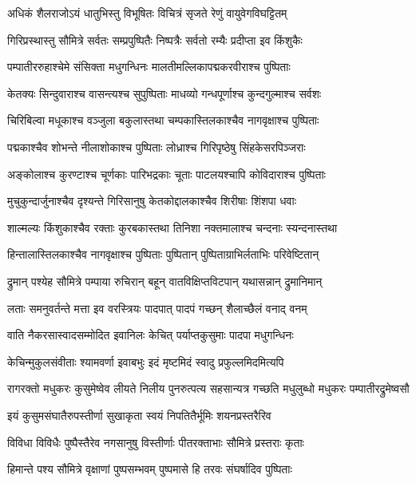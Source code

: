 \twolineshloka
{अधिकं शैलराजोऽयं धातुभिस्तु विभूषितः}
{विचित्रं सृजते रेणुं वायुवेगविघट्टितम्} %

\twolineshloka
{गिरिप्रस्थास्तु सौमित्रे सर्वतः सम्प्रपुष्पितैः}
{निष्पत्रैः सर्वतो रम्यैः प्रदीप्ता इव किंशुकैः} %

\twolineshloka
{पम्पातीररुहाश्चेमे संसिक्ता मधुगन्धिनः}
{मालतीमल्लिकापद्मकरवीराश्च पुष्पिताः} %

\twolineshloka
{केतक्यः सिन्दुवाराश्च वासन्त्यश्च सुपुष्पिताः}
{माधव्यो गन्धपूर्णाश्च कुन्दगुल्माश्च सर्वशः} %

\twolineshloka
{चिरिबिल्वा मधूकाश्च वञ्जुला बकुलास्तथा}
{चम्पकास्तिलकाश्चैव नागवृक्षाश्च पुष्पिताः} %

\twolineshloka
{पद्मकाश्चैव शोभन्ते नीलाशोकाश्च पुष्पिताः}
{लोध्राश्च गिरिपृष्ठेषु सिंहकेसरपिञ्जराः} %

\twolineshloka
{अङ्कोलाश्च कुरण्टाश्च चूर्णकाः पारिभद्रकाः}
{चूताः पाटलयश्चापि कोविदाराश्च पुष्पिताः} %

\twolineshloka
{मुचुकुन्दार्जुनाश्चैव दृश्यन्ते गिरिसानुषु}
{केतकोद्दालकाश्चैव शिरीषाः शिंशपा धवाः} %

\twolineshloka
{शाल्मल्यः किंशुकाश्चैव रक्ताः कुरबकास्तथा}
{तिनिशा नक्तमालाश्च चन्दनाः स्यन्दनास्तथा} %

\twolineshloka
{हिन्तालास्तिलकाश्चैव नागवृक्षाश्च पुष्पिताः}
{पुष्पितान् पुष्पिताग्राभिर्लताभिः परिवेष्टितान्} %

\twolineshloka
{द्रुमान् पश्येह सौमित्रे पम्पाया रुचिरान् बहून्}
{वातविक्षिप्तविटपान् यथासन्नान् द्रुमानिमान्} %

\twolineshloka
{लताः समनुवर्तन्ते मत्ता इव वरस्त्रियः}
{पादपात् पादपं गच्छन् शैलाच्छैलं वनाद् वनम्} %

\twolineshloka
{वाति नैकरसास्वादसम्मोदित इवानिलः}
{केचित् पर्याप्तकुसुमाः पादपा मधुगन्धिनः} %

\twolineshloka
{केचिन्मुकुलसंवीताः श्यामवर्णा इवाबभुः}
{इदं मृष्टमिदं स्वादु प्रफुल्लमिदमित्यपि} %

\threelineshloka
{रागरक्तो मधुकरः कुसुमेष्वेव लीयते}
{निलीय पुनरुत्पत्य सहसान्यत्र गच्छति}
{मधुलुब्धो मधुकरः पम्पातीरद्रुमेष्वसौ} %

\twolineshloka
{इयं कुसुमसंघातैरुपस्तीर्णा सुखाकृता}
{स्वयं निपतितैर्भूमिः शयनप्रस्तरैरिव} %

\twolineshloka
{विविधा विविधैः पुष्पैस्तैरेव नगसानुषु}
{विस्तीर्णाः पीतरक्ताभाः सौमित्रे प्रस्तराः कृताः} %

\twolineshloka
{हिमान्ते पश्य सौमित्रे वृक्षाणां पुष्पसम्भवम्}
{पुष्पमासे हि तरवः संघर्षादिव पुष्पिताः} %

